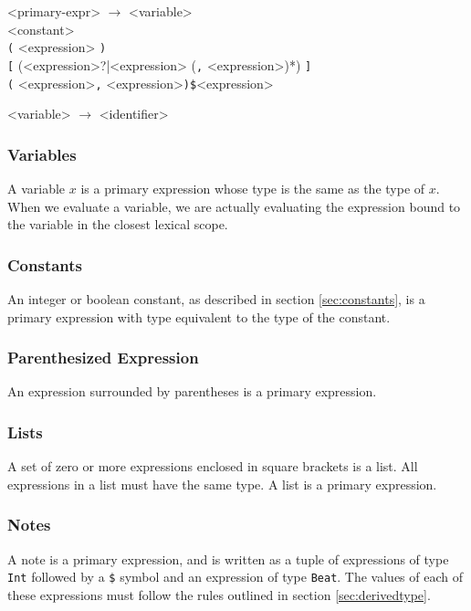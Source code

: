 \setlength{\grammarindent}{7.5em}
\begin{grammar}
<primary-expr> $\rightarrow$ <variable> \\ <constant> \\ \texttt{(} <expression> \texttt{)} \\
														\texttt{[} (<expression>?|<expression> (\texttt{,} <expression>)*) \texttt{]} \\
														\texttt{(} <expression>\texttt{,} <expression>\texttt{)\$}<expression>

<variable> $\rightarrow$ <identifier> 

\end{grammar}

\subsubsection{Variables}
A variable $x$ is a primary expression whose type is the same as the type of $x$.
When we evaluate a variable, we are actually evaluating
the expression bound to the variable in the closest lexical scope.

\subsubsection{Constants}
An integer or boolean constant, as described in section \ref{sec:constants}, is a primary expression
with type equivalent to the type of the constant.

\subsubsection{Parenthesized Expression}
An expression surrounded by parentheses is a primary expression.

\subsubsection{Lists}
A set of zero or more expressions enclosed in square brackets is a list. All expressions in
a list must have the same type. A list is a primary expression.

\subsubsection{Notes}
A note is a primary expression, and is written as a tuple of expressions of type \texttt{Int} followed
by a \texttt{\$} symbol and an expression of type \texttt{Beat}. The values of each of these
expressions must follow the rules outlined in section \ref{sec:derivedtype}.

